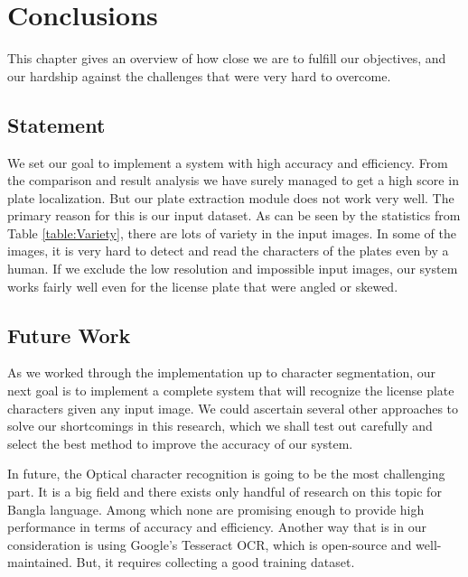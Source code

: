 \documentclass{standalone}
\begin{document}
\chapter{Conclusions}
This chapter gives an overview of how close we are to fulfill our objectives, and our hardship against the challenges that were very hard to overcome.

\section{Statement}
We set our goal to implement a system with high accuracy and efficiency. From the comparison and result analysis we have surely managed to get a high score in plate localization. But our plate extraction module does not work very well. The primary reason for this is our input dataset. As can be seen by the statistics from Table \ref{table:Variety}, there are lots of variety in the input images. In some of the images, it is very hard to detect and read the characters of the plates even by a human. If we exclude the low resolution and impossible input images, our system works fairly well even for the license plate that were angled or skewed.

\section{Future Work}
As we worked through the implementation up to character segmentation, our next goal is to implement a complete system that will recognize the license plate characters given any input image. We could ascertain several other approaches to solve our shortcomings in this research, which we shall test out carefully and select the best method to improve the accuracy of our system.

In future, the Optical character recognition is going to be the most challenging part. It is a big field and there exists only handful of research on this topic for Bangla language. Among which none are promising enough to provide high performance in terms of accuracy and efficiency. Another way that is in our consideration is using Google's Tesseract OCR, which is open-source and well-maintained. But, it requires collecting a good training dataset.
\end{document}
